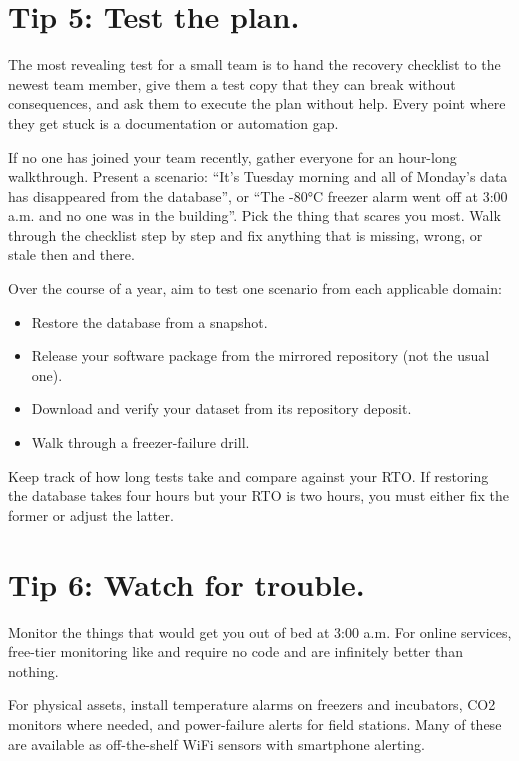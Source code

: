 \documentclass[10pt,letterpaper]{article}
\begin{document}
\section*{Tip 5: Test the plan.}

The most revealing test for a small team is to hand the recovery checklist to
the newest team member, give them a test copy that they can break without
consequences, and ask them to execute the plan without help. Every point where
they get stuck is a documentation or automation gap.

If no one has joined your team recently, gather everyone for an hour-long
walkthrough. Present a scenario: ``It's Tuesday morning and all of Monday's data
has disappeared from the database'', or ``The -80°C freezer alarm went off at 3:00
a.m. and no one was in the building''. Pick the thing that scares you most. Walk
through the checklist step by step and fix anything that is missing, wrong, or
stale then and there.

Over the course of a year, aim to test one scenario from each applicable domain:

\begin{itemize}
\item Restore the database from a snapshot.
\item Release your software package from the mirrored repository (not the usual one).
\item Download and verify your dataset from its repository deposit.
\item Walk through a freezer-failure drill.
\end{itemize}

Keep track of how long tests take and compare against your RTO. If restoring the
database takes four hours but your RTO is two hours, you must either fix the
former or adjust the latter.

\section*{Tip 6: Watch for trouble.}

Monitor the things that would get you out of bed at 3:00 a.m. For online
services, free-tier monitoring like 
and  require no code and are
infinitely better than nothing.

For physical assets, install temperature alarms on freezers and incubators, CO2
monitors where needed, and power-failure alerts for field stations.  Many of
these are available as off-the-shelf WiFi sensors with smartphone alerting.
\end{document}
